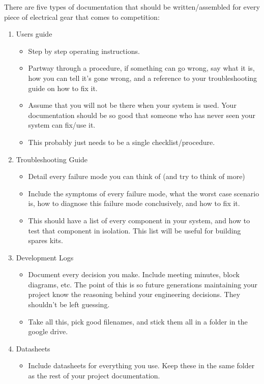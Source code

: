 \documentclass{article}
\begin{document}
There are five types of documentation that should be written/assembled for every piece of electrical gear that comes to competition:

\begin{enumerate}
\item Users guide
\begin{itemize}
\item Step by step operating instructions.
\item Partway through a procedure, if something can go wrong, say what it is, how you can tell it's gone wrong, and a reference to your troubleshooting guide on how to fix it.
\item Assume that you will not be there when your system is used. Your documentation should be so good that someone who has never seen your system can fix/use it.
\item This probably just needs to be a single checklist/procedure.
\end{itemize}
\item Troubleshooting Guide
\begin{itemize}
\item Detail every failure mode you can think of (and try to think of more)
\item Include the symptoms of every failure mode, what the worst case scenario is, how to diagnose this failure mode conclusively, and how to fix it.
\item This should have a list of every component in your system, and how to test that component in isolation. This list will be useful for building spares kits.
\end{itemize}
\item Development Logs
\begin{itemize}
\item Document every decision you make. Include meeting minutes, block diagrams, etc. The point of this is so future generations maintaining your project know the reasoning behind your engineering decisions. They shouldn't be left guessing.
\item Take all this, pick good filenames, and stick them all in a folder in the google drive.
\end{itemize}
\item Datasheets
\begin{itemize}
\item Include datasheets for everything you use. Keep these in the same folder as the rest of your project documentation.
\end{itemize}

\end{enumerate}
\end{document}
